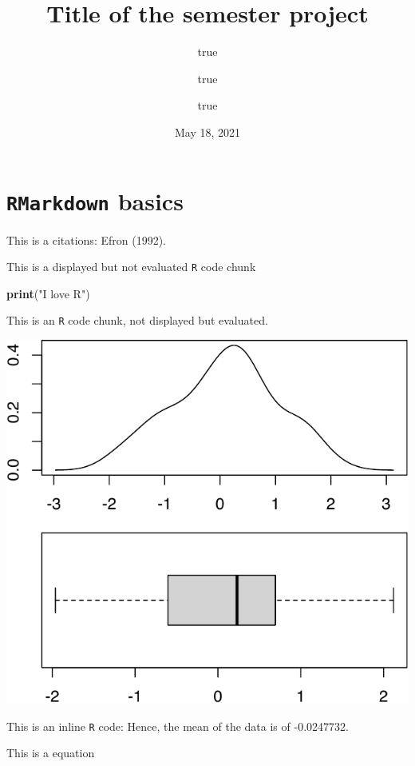 \documentclass[11pt,]{article}
\title{Title of the semester project}
\author{true \and true \and true}
\date{May 18, 2021}
\newenvironment{Shaded}{\begin{snugshade}}{\end{snugshade}}
\newcommand{\KeywordTok}[1]{\textcolor[rgb]{0.13,0.29,0.53}{\textbf{#1}}}
\newcommand{\NormalTok}[1]{#1}
\newcommand{\StringTok}[1]{\textcolor[rgb]{0.31,0.60,0.02}{#1}}
\begin{document}
\maketitle

\hypertarget{rmarkdown-basics}{%
\section{\texorpdfstring{\texttt{RMarkdown}
basics}{RMarkdown basics}}\label{rmarkdown-basics}}

This is a citations: Efron (1992).

This is a displayed but not evaluated \texttt{R} code chunk

\begin{Shaded}
\begin{Highlighting}[]
\KeywordTok{print}\NormalTok{(}\StringTok{"I love R"}\NormalTok{)}
\end{Highlighting}
\end{Shaded}

This is an \texttt{R} code chunk, not displayed but evaluated.

\begin{center}\includegraphics{README_files/figure-latex/unnamed-chunk-2-1} \end{center}

This is an inline \texttt{R} code: Hence, the mean of the data is of
-0.0247732.

This is a  equation
\end{document}
